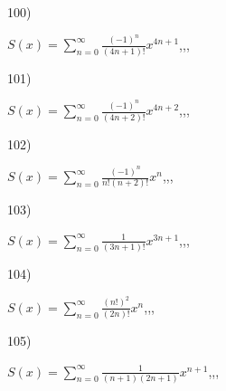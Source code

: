 \documentclass[11pt, ukrainian]{article}
\begin{document}
\par
\vspace{0.9cm}
100) \space 
{%
{$S(x)=\sum\limits_{n=0}^{\infty}{\frac{(-1)^n}{(4n+1)!}}{x^{{4n+1}}}$},,, \par \smallskip  
}
\par
\newpage
101) \space 
{%
{$S(x)=\sum\limits_{n=0}^{\infty}{\frac{(-1)^n}{(4n+2)!}}{x^{{4n+2}}}$},,, \par \smallskip  
}
\par
\vspace{0.9cm}
102) \space 
{%
{$S(x)=\sum\limits_{n=0}^{\infty}{\frac{(-1)^n}{n!(n+2)!}}{x^{{n}}}$},,, \par \smallskip  
}
\par
\vspace{0.9cm}
103) \space 
{%
{$S(x)=\sum\limits_{n=0}^{\infty}{\frac{1}{(3n+1)!}}{x^{{3n+1}}}$},,, \par \smallskip  
}
\par
\vspace{0.9cm}
104) \space 
{%
{$S(x)=\sum\limits_{n=0}^{\infty}{\frac{(n!)^2}{(2n)!}}{x^{{n}}}$},,, \par \smallskip  
}
\par
\vspace{0.9cm}
105) \space 
{%
{$S(x)=\sum\limits_{n=0}^{\infty}{\frac{1}{(n+1)(2n+1)}}{x^{{n+1}}}$},,, \par \smallskip  
}
\end{document}
